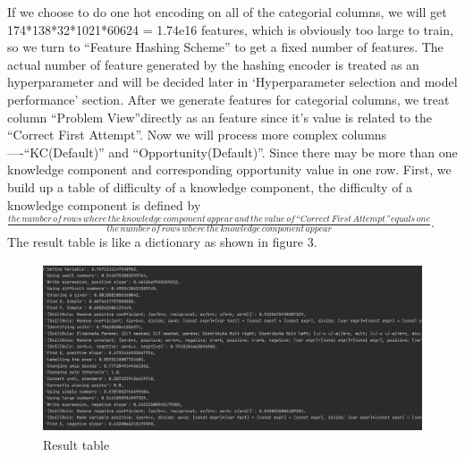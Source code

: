 \documentclass{article}
\begin{document}
If we choose to do one hot encoding on all of the categorial columns, we will get 174*138*32*1021*60624 = 1.74e16 features, which is obviously too large to train, so we turn to “Feature Hashing Scheme” to get a fixed number of features. The actual number of feature generated by the hashing encoder is treated as an hyperparameter and will be decided later in ‘Hyperparameter selection and model performance’ section. After we generate features for categorial columns, we treat column “Problem View”directly as an feature since it’s value is related to the “Correct First Attempt”. Now we will process more complex columns—-“KC(Default)” and “Opportunity(Default)”. Since there may be more than one knowledge component and corresponding opportunity value in one row. First, we build up a table of difficulty of a knowledge component, the difficulty of a knowledge component is defined by $\frac{the\,number \,of \,rows\, where \,the \,knowledge \,component\, appear\, and \,the\, value\, of \,“Correct\, First \,Attempt\,” equals \,one}{ the\, number 
\,of \,rows\, where \,the\, knowledge\, component \,appear}$.\\
The result table is like a dictionary as shown in figure 3.

\begin{figure}[h]
\centering
\includegraphics[width=12cm,height=5cm]{figure3.jpg}
\caption{Result table}
\end{figure}
\end{document}
